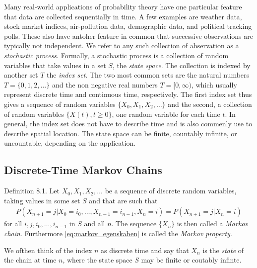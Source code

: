 Many real-world applications of probability theory have one particular feature that data are collected sequentially in time.
A few examples are weather data, stock market indices, air-pollution data, demographic data, and political tracking polls.
These also have antoher feature in common that successive observations are typically not independent.
We refer to any such collection of abservation as a \textit{stochastic process}.
Formally, a stochastic process is a collection of random variables that take values in a set $S$, the \textit{state space}.
The collection is indexed by another set $T$ the \textit{index set}.
The two most common sets are the natural numbers $T = \{0, 1, 2, \ldots\}$ and the non negative real numbers $T = [0, \infty)$, which usually represent discrete time and continuous time, respectively.
The first index set thus gives a sequence of random variables $\{X_0, X_1, X_2, \ldots \}$ and the second, a  collection of random variables $\{X(t), t \geq 0 \}$, one random variable for each time $t$.
In general, the index set does not have to describe time and is also commenly use to describe spatial location.
The state space can be finite, countably infinite, or uncountable, depending on the application.

\subsection{Discrete-Time Markov Chains}
\begin{boks}{Definition 8.1.}
  Let $X_0, X_1, X_2, \ldots$ be a sequence of discrete random variables, taking values in some set $S$ and that are such that
  \begin{align}\label{eq:markov_egenskaben}
    P(X_{n + 1} = j | X_0 = i_0, \ldots, X_{n - 1} = i_{n - 1}, X_n = i) =
    P(X_{n + 1} = j | X_n = i)
  \end{align}
  for all $i, j, i_0, \ldots, i_{n - 1}$ in $S$ and all $n$. The sequence $\{ X_n \}$ is then called a \textit{Markov chain}. Furthermore \eqref{eq:markov_egenskaben} is called the \textit{Markov property}.
\end{boks}
We ofthen think of the index $n$ as discrete time and say that $X_n$ is the \textit{state} of the chain at time $n$, where the state space $S$ may be finite or coutably infinte.

